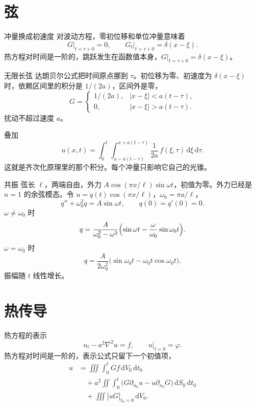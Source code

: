 \documentclass[fontset=windows, chinese, 10pt, xcolor=dvipsnames]{beamer}
\begin{document}
\section{弦}

\begin{frame}{冲量换成初速度}
  对波动方程，零初位移和单位冲量意味着
  \[
    G\big|_{t=\tau+0}=0,
    \qquad
    G_t\big|_{t=\tau+0}=\delta(x-\xi).
  \]
  热方程对时间是一阶的，跳跃发生在函数值本身，$G|_{t=\tau+0}=\delta(x-\xi)$。
\end{frame}

\begin{frame}{无限长弦}
  达朗贝尔公式把时间原点挪到 $\tau$。初位移为零、初速度为 $\delta(x-\xi)$ 时，依赖区间里的积分是 $1/(2a)$，区间外是零，
  \begin{equation*}
    \boxed{\displaystyle
    G=
    \begin{cases}
      1/(2a), & |x-\xi|<a(t-\tau),\\
      0, & |x-\xi|>a(t-\tau).
    \end{cases}}
  \end{equation*}
  扰动不超过速度 $a$。
\end{frame}

\begin{frame}{叠加}
  \[
    u(x,t)
    =\int_0^{t}\int_{x-a(t-\tau)}^{x+a(t-\tau)}
      \frac{1}{2a}\,f(\xi,\tau)\,\mathrm{d}\xi\,\mathrm{d}\tau.
  \]
  这就是齐次化原理里的那个积分。每个冲量只影响它自己的光锥。
\end{frame}

\begin{frame}{共振}
  弦长 $\ell$，两端自由，外力 $A\cos(\pi x/\ell)\sin\omega t$，初值为零。外力已经是 $n=1$ 的余弦模态。令 $u=q(t)\cos(\pi x/\ell)$，$\omega_0=\pi a/\ell$，
  \[
    q''+\omega_0^2 q=A\sin\omega t,
    \qquad q(0)=q'(0)=0.
  \]
  $\omega\neq\omega_0$ 时
  \[
    q=\frac{A}{\omega_0^2-\omega^2}
      \Bigl(\sin\omega t-\frac{\omega}{\omega_0}\sin\omega_0 t\Bigr).
  \]
  $\omega=\omega_0$ 时
  \[
    q=\frac{A}{2\omega_0^2}
      \bigl(\sin\omega_0 t-\omega_0 t\cos\omega_0 t\Bigr).
  \]
  振幅随 $t$ 线性增长。
\end{frame}

\section{热传导}

\begin{frame}{热方程的表示}
  \[
    u_t-a^2\nabla^2 u=f,
    \qquad u|_{t=0}=\varphi.
  \]
  热方程对时间是一阶的，表示公式只留下一个初值项，
  \begin{align*}
    u
    &=\iiint\int_0^{t} G f\,\mathrm{d}V_0\,\mathrm{d}t_0\\
    &\quad+a^2\iint\int_0^{t}
        \bigl(G\partial_{n_0}u-u\partial_{n_0}G\bigr)
        \,\mathrm{d}S_0\,\mathrm{d}t_0\\
    &\quad+\iiint\bigl[u G\bigr]_{t_0=0}\,\mathrm{d}V_0.
  \end{align*}
\end{frame}
\end{document}
